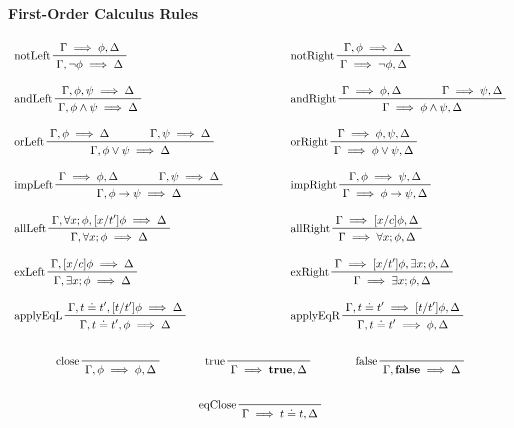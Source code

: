 		\paragraph{First-Order Calculus Rules}
			\begin{gather*}
				\begin{array}{lcl}
					\prftree[l]{notLeft}{\Gamma \implies \phi, \Delta}{\Gamma, \lnot\phi \implies \Delta}                                           & \quad\quad\quad\quad & \prftree[l]{notRight}{\Gamma, \phi \implies \Delta}{\Gamma \implies \lnot\phi, \Delta}                                             \\\\
					\prftree[l]{andLeft}{\Gamma, \phi, \psi \implies \Delta}{\Gamma, \phi \land \psi \implies \Delta}                               &                      & \prftree[l]{andRight}{\Gamma \implies \phi, \Delta}{\qquad}{\Gamma \implies \psi, \Delta}{\Gamma \implies \phi \land \psi, \Delta} \\\\
					\prftree[l]{orLeft}{\Gamma, \phi \implies \Delta}{\qquad}{\Gamma, \psi \implies \Delta}{\Gamma, \phi \lor \psi \implies \Delta} &                      & \prftree[l]{orRight}{\Gamma \implies \phi, \psi, \Delta}{\Gamma \implies \phi \lor \psi, \Delta}                                   \\\\
					\prftree[l]{impLeft}{\Gamma \implies \phi, \Delta}{\qquad}{\Gamma, \psi \implies \Delta}{\Gamma, \phi \to \psi \implies \Delta} &                      & \prftree[l]{impRight}{\Gamma, \phi \implies \psi, \Delta}{\Gamma \implies \phi \to \psi, \Delta}                                   \\\\
					\prftree[l]{allLeft}{\Gamma, \forall x; \phi, [x/t']\phi \implies \Delta}{\Gamma, \forall x; \phi \implies \Delta}              &                      & \prftree[l]{allRight}{\Gamma \implies [x/c]\phi, \Delta}{\Gamma \implies \forall x; \phi, \Delta}                                  \\\\
					\prftree[l]{exLeft}{\Gamma, [x/c]\phi \implies \Delta}{\Gamma, \exists x; \phi \implies \Delta}                                 &                      & \prftree[l]{exRight}{\Gamma \implies [x/t']\phi, \exists x; \phi, \Delta}{\Gamma \implies \exists x; \phi, \Delta}                 \\\\
					\prftree[l]{applyEqL}{\Gamma, t \doteq t', [t/t']\phi \implies \Delta}{\Gamma, t \doteq t', \phi \implies \Delta}               &                      & \prftree[l]{applyEqR}{\Gamma, t \doteq t' \implies [t/t']\phi, \Delta}{\Gamma, t \doteq t' \implies \phi, \Delta}
				\end{array} \\\\
				\prftree[l]{close}{\Gamma, \phi \implies \phi, \Delta} \quad\quad\quad\quad \prftree[l]{true}{\Gamma \implies \textbf{true}, \Delta} \quad\quad\quad\quad \prftree[l]{false}{\Gamma, \textbf{false} \implies \Delta} \\\\
				\prftree[l]{eqClose}{\Gamma \implies t \doteq t, \Delta}
			\end{gather*}
